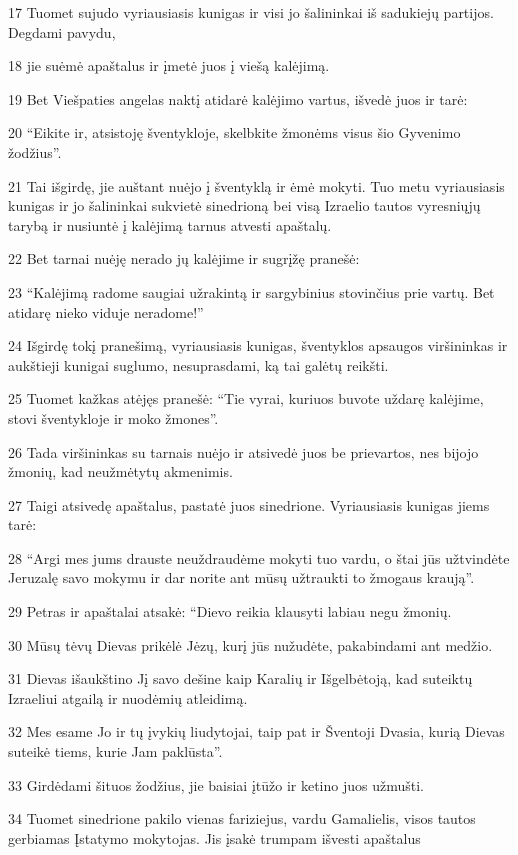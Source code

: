 \par 17 Tuomet sujudo vyriausiasis kunigas ir visi jo šalininkai iš sadukiejų partijos. Degdami pavydu, 
\par 18 jie suėmė apaštalus ir įmetė juos į viešą kalėjimą. 
\par 19 Bet Viešpaties angelas naktį atidarė kalėjimo vartus, išvedė juos ir tarė: 
\par 20 “Eikite ir, atsistoję šventykloje, skelbkite žmonėms visus šio Gyvenimo žodžius”. 
\par 21 Tai išgirdę, jie auštant nuėjo į šventyklą ir ėmė mokyti. Tuo metu vyriausiasis kunigas ir jo šalininkai sukvietė sinedrioną bei visą Izraelio tautos vyresniųjų tarybą ir nusiuntė į kalėjimą tarnus atvesti apaštalų. 
\par 22 Bet tarnai nuėję nerado jų kalėjime ir sugrįžę pranešė: 
\par 23 “Kalėjimą radome saugiai užrakintą ir sargybinius stovinčius prie vartų. Bet atidarę nieko viduje neradome!” 
\par 24 Išgirdę tokį pranešimą, vyriausiasis kunigas, šventyklos apsaugos viršininkas ir aukštieji kunigai suglumo, nesuprasdami, ką tai galėtų reikšti. 
\par 25 Tuomet kažkas atėjęs pranešė: “Tie vyrai, kuriuos buvote uždarę kalėjime, stovi šventykloje ir moko žmones”. 
\par 26 Tada viršininkas su tarnais nuėjo ir atsivedė juos be prievartos, nes bijojo žmonių, kad neužmėtytų akmenimis. 
\par 27 Taigi atsivedę apaštalus, pastatė juos sinedrione. Vyriausiasis kunigas jiems tarė: 
\par 28 “Argi mes jums drauste neuždraudėme mokyti tuo vardu, o štai jūs užtvindėte Jeruzalę savo mokymu ir dar norite ant mūsų užtraukti to žmogaus kraują”. 
\par 29 Petras ir apaštalai atsakė: “Dievo reikia klausyti labiau negu žmonių. 
\par 30 Mūsų tėvų Dievas prikėlė Jėzų, kurį jūs nužudėte, pakabindami ant medžio. 
\par 31 Dievas išaukštino Jį savo dešine kaip Karalių ir Išgelbėtoją, kad suteiktų Izraeliui atgailą ir nuodėmių atleidimą. 
\par 32 Mes esame Jo ir tų įvykių liudytojai, taip pat ir Šventoji Dvasia, kurią Dievas suteikė tiems, kurie Jam paklūsta”. 
\par 33 Girdėdami šituos žodžius, jie baisiai įtūžo ir ketino juos užmušti. 
\par 34 Tuomet sinedrione pakilo vienas fariziejus, vardu Gamalielis, visos tautos gerbiamas Įstatymo mokytojas. Jis įsakė trumpam išvesti apaštalus 
